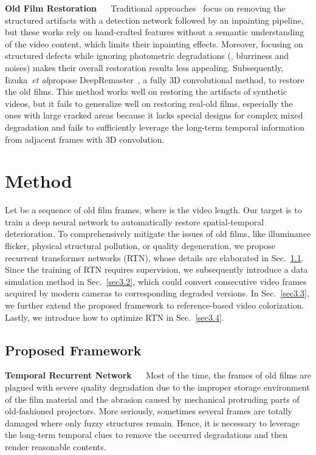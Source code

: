 \documentclass[10pt,twocolumn,letterpaper]{article}
\def\etal{\emph{et al}\onedot}
\begin{document}
	\noindent\textbf{Old Film Restoration} ~~ Traditional approaches~\cite{giakoumis2005digital,hongying2009efficient,kim2006efficient,saito1999image} focus on removing the structured artifacts with a detection network followed by an inpainting pipeline, but these works rely on hand-crafted features without a semantic understanding of the video content, which limits their inpainting effects. Moreover, focusing on structured defects while ignoring photometric degradations (\eg, blurriness and noises) makes their overall restoration results less appealing. Subsequently, Iizuka~\etal propose DeepRemaster~\cite{iizuka2019deepremaster}, a fully 3D convolutional method, to restore the old films. This method works well on restoring the artifacts of synthetic videos, but it fails to generalize well on restoring real-old films, especially the ones with large cracked areas because it lacks special designs for complex mixed degradation and fails to sufficiently leverage the long-term temporal information from adjacent frames with 3D convolution.
	
	
	\section{Method}
	
	Let  be a sequence of old film frames, where  is the video length. Our target is to train a deep neural network to automatically restore spatial-temporal deterioration. To comprehensively mitigate the issues of old films, like illuminance flicker, physical structural pollution, or quality degeneration, we propose recurrent transformer networks (RTN), whose details are elaborated in Sec.~\ref{sec3.1}. Since the training of RTN requires supervision, we subsequently introduce a data simulation method in Sec.~\ref{sec3.2}, which could convert consecutive video frames acquired by modern cameras to corresponding degraded versions. In Sec.~\ref{sec3.3}, we further extend the proposed framework to reference-based video colorization.  Lastly,  we introduce how to optimize RTN in Sec.~\ref{sec3.4}. 
	
	\subsection{Proposed Framework}\label{sec3.1}
	
	\noindent\textbf{Temporal Recurrent Network} ~~ Most of the time, the frames of old films are plagued with severe quality degradation due to the improper storage environment of the film material and the abrasion caused by mechanical protruding parts of old-fashioned projectors. More seriously, sometimes several frames are totally damaged where only fuzzy structures remain. Hence, it is necessary to leverage the long-term temporal clues to remove the occurred degradations and then render reasonable contents.
	
\end{document}

